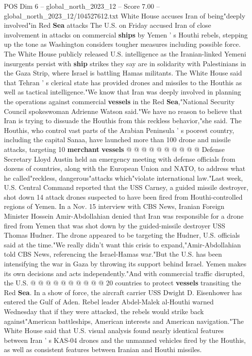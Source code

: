 \begin{textsample}{POS Dim 6 – global\_north\_2023\_12 – Score 7.00 – global\_north\_2023\_12/104527612.txt}  \label{ex:f6_pos_188}
White House accuses Iran of being"deeply involved"in Red \textbf{Sea} attacks The U.S. on Friday accused Iran of close involvement in attacks on commercial \textbf{ships} by Yemen ' s Houthi rebels, stepping up the tone as Washington considers tougher measures including possible force.
The White House publicly released U.S. intelligence as the Iranian-linked Yemeni insurgents persist with \textbf{ship} strikes they say are in solidarity with Palestinians in the Gaza Strip, where Israel is battling Hamas militants.
The White House said that Tehran ' s clerical state has provided drones and missiles to the Houthis as well as tactical intelligence."We know that Iran was deeply involved in planning the operations against commercial \textbf{vessels} in the Red \textbf{Sea},"National Security Council spokeswoman Adrienne Watson said."We have no reason to believe that Iran is trying to dissuade the Houthis from this reckless behavior,"she said.
The Houthis, who control vast parts of the Arabian Peninsula ' s poorest country, including the capital Sanaa, have launched more than 100 drone and missile attacks, targeting 10 \textbf{merchant} \textbf{vessels} @ @ @ @ @ @ @ @ @ @ Defense Secretary Lloyd Austin held an emergency meeting with defense officials from dozens of countries, along with the European Union and NATO, to address what he called"reckless, dangerous"attacks which"violate international law."Last week, U.S.
Central Command reported that the USS Carney, a guided missile destroyer, shot down 14 attack drones suspected to have been fired from Houthi-controlled regions of Yemen.
In a Nov. 15 interview with CBS News, Iranian Foreign Minister Hossein Amir-Abdollahian denied that Iran was responsible for a drone fired from Yemen that was shot down by the guided-missile destroyer USS Thomas Hudner.
The drone appeared to be targeting the Hudner, U.S. officials said at the time."We really didn't want this crisis to expand,"Amir-Abdollahian told CBS News, referencing the Israel-Hamas war."But the U.S. has been intensifying the war in Gaza by throwing its support behind Israel.
Yemen makes its own decisions and acts independently."And with commercial traffic disrupted, the U.S. @ @ @ @ @ @ @ @ @ @ 20 countries to protect \textbf{vessels} transiting the Red \textbf{Sea}.
In a show of force, the aircraft carrier USS Dwight D.
Eisenhower has entered the Gulf of Aden.
Rebel leader Abdel-Malek al-Houthi warned Wednesday that if they were attacked, the rebels would strike back against"American battleships, American interests and American navigation."The White House said that U.S. visual analysis found nearly identical features between Iran ' s KAS-04 drones and the unmanned vehicles fired by the Houthis, as well as consistent features between Iranian and Houthi missiles.

\end{textsample}
